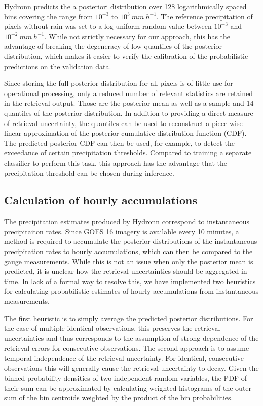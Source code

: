 \documentclass[journal abbreviation, manuscript]{copernicus}
\begin{document}
Hydronn predicts the a posteriori distribution over 128 logarithmically spaced
bins covering the range from $10^{-3}$ to $10^3\ \unit{mm\ h^{-1}}$. The
reference precipitation of pixels without rain was set to a log-uniform random
value between $10^{-3}$ and $10^{-2}\ \unit{mm\ h^{-1}}$. While not strictly
necessary for our approach, this has the advantage of breaking the degeneracy of
low quantiles of the posterior distribution, which makes it easier to verify the
calibration of the probabilistic predictions on the validation data.

Since storing the full posterior distribution for all pixels is of little use
for operational processing, only a reduced number of relevant statistics are
retained in the retrieval output. Those are the posterior mean as well as a
sample and 14 quantiles of the posterior distribution. In addition to providing
a direct measure of retrieval uncertainty, the quantiles can be used to
reconstruct a piece-wise linear approximation of the posterior cumulative
distribution function (CDF). The predicted posterior CDF can then be used, for
example, to detect the exceedance of certain precipitation thresholds. Compared
to training a separate classifier to perform this task, this approach has the
advantage that the precipitation threshold can be chosen during inference.

\subsection{Calculation of hourly accumulations}
\label{sec:accumulation}

The precipitation estimates produced by Hydronn correspond to instantaneous
precipitaiton rates. Since GOES 16 imagery is available every 10 minutes, a
method is required to accumulate the posterior distributions of the
instantaneous precipitation rates to hourly accumulations, which can then be
compared to the gauge measurements. While this is not an issue when only the
posterior mean is predicted, it is unclear how the retrieval uncertainties
should be aggregated in time. In lack of a formal way to resolve this, we have
implemented two heuristics for calculating probabilistic estimates of hourly
accumulations from instantaneous measurements.

The first heuristic is to simply average the predicted posterior distributions.
For the case of multiple identical observations, this preserves the retrieval
uncertainties and thus corresponds to the assumption of strong dependence of the
retrieval errors for consecutive observations. The second approach is to assume
temporal independence of the retrieval uncertainty. For identical, consecutive
observations this will generally cause the retrieval uncertainty to decay. Given
the binned probability densities of two independent random variables, the PDF of
their sum can be approximated by calculating weighted histograms of the outer
sum of the bin centroids weighted by the product of the bin probabilities.
\end{document}
